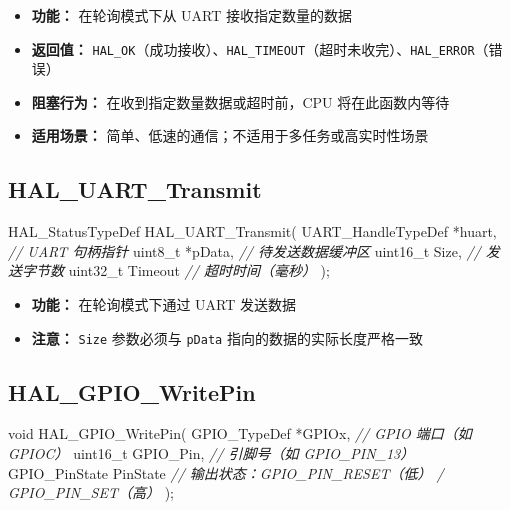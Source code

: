 \documentclass[
  chinese,
  UTF8,
  oneside,
  openany]{ctexbook}
\newenvironment{Shaded}{}{}
\newcommand{\CommentTok}[1]{\textcolor[rgb]{0.38,0.63,0.69}{\textit{#1}}}
\newcommand{\DataTypeTok}[1]{\textcolor[rgb]{0.56,0.13,0.00}{#1}}
\newcommand{\NormalTok}[1]{#1}
\newcommand{\OperatorTok}[1]{\textcolor[rgb]{0.40,0.40,0.40}{#1}}
\providecommand{\tightlist}{%
  \setlength{\itemsep}{0pt}\setlength{\parskip}{0pt}}
\begin{document}
\begin{itemize}
\tightlist
\item
  \textbf{功能：} 在轮询模式下从 UART 接收指定数量的数据
\item
  \textbf{返回值：}
  \texttt{HAL\_OK}（成功接收）、\texttt{HAL\_TIMEOUT}（超时未收完）、\texttt{HAL\_ERROR}（错误）
\item
  \textbf{阻塞行为：} 在收到指定数量数据或超时前，CPU 将在此函数内等待
\item
  \textbf{适用场景：} 简单、低速的通信；不适用于多任务或高实时性场景
\end{itemize}

\subsection{HAL\_UART\_Transmit}\label{hal_uart_transmit}

\begin{Shaded}
\begin{Highlighting}[]
\NormalTok{HAL\_StatusTypeDef HAL\_UART\_Transmit}\OperatorTok{(}
\NormalTok{    UART\_HandleTypeDef }\OperatorTok{*}\NormalTok{huart}\OperatorTok{,}  \CommentTok{// UART 句柄指针}
    \DataTypeTok{uint8\_t}           \OperatorTok{*}\NormalTok{pData}\OperatorTok{,}   \CommentTok{// 待发送数据缓冲区}
    \DataTypeTok{uint16\_t}\NormalTok{           Size}\OperatorTok{,}    \CommentTok{// 发送字节数}
    \DataTypeTok{uint32\_t}\NormalTok{           Timeout  }\CommentTok{// 超时时间（毫秒）}
\OperatorTok{);}
\end{Highlighting}
\end{Shaded}

\begin{itemize}
\tightlist
\item
  \textbf{功能：} 在轮询模式下通过 UART 发送数据
\item
  \textbf{注意：} \texttt{Size} 参数必须与 \texttt{pData}
  指向的数据的实际长度严格一致
\end{itemize}

\subsection{HAL\_GPIO\_WritePin}\label{hal_gpio_writepin}

\begin{Shaded}
\begin{Highlighting}[]
\DataTypeTok{void}\NormalTok{ HAL\_GPIO\_WritePin}\OperatorTok{(}
\NormalTok{    GPIO\_TypeDef }\OperatorTok{*}\NormalTok{GPIOx}\OperatorTok{,}        \CommentTok{// GPIO 端口（如 GPIOC）}
    \DataTypeTok{uint16\_t}\NormalTok{      GPIO\_Pin}\OperatorTok{,}     \CommentTok{// 引脚号（如 GPIO\_PIN\_13）}
\NormalTok{    GPIO\_PinState PinState      }\CommentTok{// 输出状态：GPIO\_PIN\_RESET（低） / GPIO\_PIN\_SET（高）}
\OperatorTok{);}
\end{Highlighting}
\end{Shaded}
\end{document}
